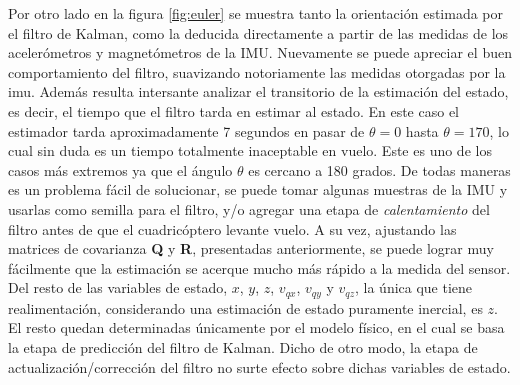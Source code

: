 \documentclass[main]{subfiles}
\begin{document}
Por otro lado en la figura \ref{fig:euler} se muestra tanto la orientación estimada por el filtro de Kalman, como la deducida directamente a partir de las medidas de los acelerómetros y magnetómetros de la IMU. Nuevamente se puede apreciar el buen comportamiento del filtro, suavizando notoriamente las medidas otorgadas por la imu. Además resulta intersante analizar el transitorio de la estimación del estado, es decir, el tiempo que el filtro tarda en estimar al estado. En este caso el estimador tarda aproximadamente 7 segundos en pasar de $\theta = 0$ hasta $\theta = 170$, lo cual sin duda es un tiempo totalmente inaceptable en vuelo. Este es uno de los casos más extremos ya que el ángulo $\theta$ es cercano a 180 grados. De todas maneras es un problema fácil de solucionar, se puede tomar algunas muestras de la IMU y usarlas como semilla para el filtro, y/o agregar una etapa de \emph{calentamiento} del filtro antes de que el cuadricóptero levante vuelo. A su vez, ajustando las matrices de covarianza \textbf{Q} y \textbf{R}, presentadas anteriormente, se puede lograr muy fácilmente que la estimación se acerque mucho más rápido a la medida del sensor.\\

Del resto de las variables de estado, $x$, $y$, $z$, $v_{qx}$, $v_{qy}$ y $v_{qz}$, la única que tiene realimentación, considerando una estimación de estado puramente inercial, es $z$. El resto quedan determinadas únicamente por el modelo físico, en el cual se basa la etapa de predicción del filtro de Kalman. Dicho de otro modo, la etapa de actualización/corrección del filtro no surte efecto sobre dichas variables de estado.\\

\begin{figure} [h!]
\centering
   \hspace{10pt}
  \caption{}
  \label{fig:posyvel}
\end{figure}
\end{document}
